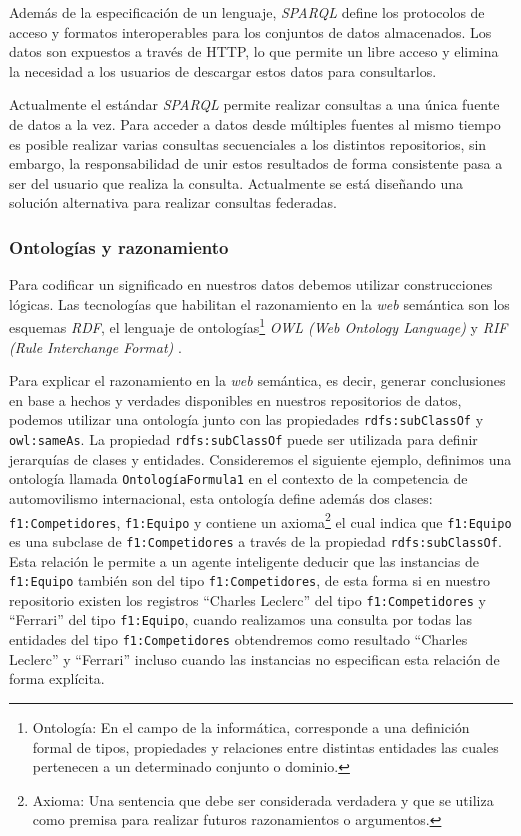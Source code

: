 Además de la especificación de un lenguaje, \textit{SPARQL} define los protocolos de acceso y formatos interoperables para los conjuntos de datos almacenados. Los datos son expuestos a través de HTTP, lo que permite un libre acceso y elimina la necesidad a los usuarios de descargar estos datos para consultarlos.

Actualmente el estándar \textit{SPARQL} permite realizar consultas a una única fuente de datos a la vez. Para acceder a datos desde múltiples fuentes al mismo tiempo es posible realizar varias consultas secuenciales a los distintos repositorios, sin embargo, la responsabilidad de unir estos resultados de forma consistente pasa a ser del usuario que realiza la consulta. Actualmente se está diseñando una solución alternativa para realizar consultas federadas.

\subsubsection{Ontologías y razonamiento}
\label{sec:ontologia-y-razonamiento}

Para codificar un significado en nuestros datos debemos utilizar construcciones lógicas. Las tecnologías que habilitan el razonamiento en la \textit{web} semántica son los esquemas \textit{RDF}, el lenguaje de ontologías\footnote{Ontología: En el campo de la informática, corresponde a una definición formal de tipos, propiedades y relaciones entre distintas entidades las cuales pertenecen a un determinado conjunto o dominio.} \textit{OWL (Web Ontology Language)} \cite{antoniou2004web} y \textit{RIF (Rule Interchange Format)} \cite{kifer2008rule}.

Para explicar el razonamiento en la \textit{web} semántica, es decir, generar conclusiones en base a hechos y verdades disponibles en nuestros repositorios de datos, podemos utilizar una ontología junto con las propiedades \texttt{rdfs:subClassOf} y \texttt{owl:sameAs}. La propiedad \texttt{rdfs:subClassOf} puede ser utilizada para definir jerarquías de clases y entidades. Consideremos el siguiente ejemplo, definimos una ontología llamada \texttt{OntologíaFormula1} en el contexto de la competencia de automovilismo internacional, esta ontología define además dos clases: \texttt{f1:Competidores}, \texttt{f1:Equipo} y contiene un axioma\footnote{Axioma: Una sentencia que debe ser considerada verdadera y que se utiliza como premisa para realizar futuros razonamientos o argumentos.} el cual indica que \texttt{f1:Equipo} es una subclase de \texttt{f1:Competidores} a través de la propiedad \texttt{rdfs:subClassOf}. Esta relación le permite a un agente inteligente deducir que las instancias de \texttt{f1:Equipo} también son del tipo \texttt{f1:Competidores}, de esta forma si en nuestro repositorio existen los registros ``Charles Leclerc'' del tipo \texttt{f1:Competidores} y ``Ferrari'' del tipo \texttt{f1:Equipo}, cuando realizamos una consulta por todas las entidades del tipo \texttt{f1:Competidores} obtendremos como resultado ``Charles Leclerc'' y ``Ferrari'' incluso cuando las instancias no especifican esta relación de forma explícita.

